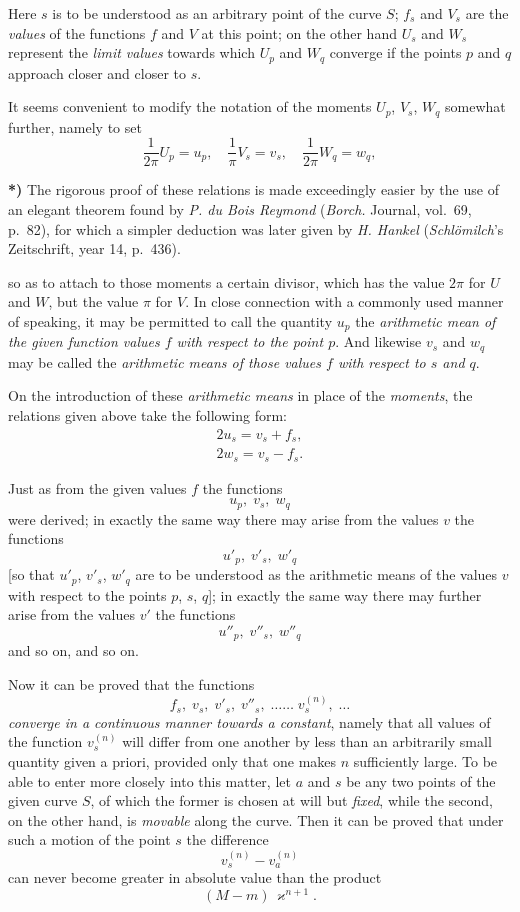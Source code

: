 \documentclass{article}
\begin{document}
Here $s$ is to be understood as an arbitrary point of the curve $S$; $f_{s}$ and $V_{s}$ are the \emph{values} of the functions $f$ and $V$ at this point; on the other hand $U_{s}$ and $W_{s}$ represent the \emph{limit values} towards which $U_{p}$ and $W_{q}$ converge if the points $p$ and $q$ approach closer and closer to $s$.

It seems convenient to modify the notation of the moments $U_{p}$, $V_{s}$, $W_{q}$ somewhat further, namely to set
\[
\frac{1}{2\pi}U_{p}=u_{p}, \quad \frac{1}{\pi}V_{s}=v_{s}, \quad \frac{1}{2\pi}W_{q}=w_{q},
\]

\textbf{*)} The rigorous proof of these relations is made exceedingly easier by the use of an elegant theorem found by \emph{P. du Bois Reymond} (\emph{Borch.} Journal, vol.\ 69, p.\ 82), for which a simpler deduction was later given by \emph{H. Hankel} (\emph{Schlömilch}'s Zeitschrift, year 14, p.\ 436).

so as to attach to those moments a certain divisor, which has the value $2\pi$ for $U$ and $W$, but the value $\pi$ for $V$. In close connection with a commonly used manner of speaking, it may be permitted to call the quantity $u_{p}$ the \emph{arithmetic mean of the given function values $f$ with respect to the point $p$}. And likewise $v_{s}$ and $w_{q}$ may be called the \emph{arithmetic means of those values $f$ with respect to $s$ and $q$}.

On the introduction of these \emph{arithmetic means} in place of the \emph{moments}, the relations given above take the following form:
\[
\begin{gathered}
2u_{s}=v_{s}+f_{s},\\
2w_{s}=v_{s}-f_{s}.
\end{gathered}
\]

Just as from the given values $f$ the functions
\[
u_{p},\; v_{s},\; w_{q}
\]
were derived; in exactly the same way there may arise from the values $v$ the functions
\[
u'_{p},\; v'_{s},\; w'_{q}
\]
[so that $u'_{p}$, $v'_{s}$, $w'_{q}$ are to be understood as the arithmetic means of the values $v$ with respect to the points $p$, $s$, $q$]; in exactly the same way there may further arise from the values $v'$ the functions
\[
u''_{p},\; v''_{s},\; w''_{q}
\]
and so on, and so on.

Now it can be proved that the functions
\[
f_{s},\; v_{s},\; v'_{s},\; v''_{s},\; \ldots\ldots\; v_{s}^{(n)},\; \ldots
\]
\emph{converge in a continuous manner towards a constant}, namely that all values of the function $v_{s}^{(n)}$ will differ from one another by less than an arbitrarily small quantity given a priori, provided only that one makes $n$ sufficiently large. To be able to enter more closely into this matter, let $a$ and $s$ be any two points of the given curve $S$, of which the former is chosen at will but \emph{fixed}, while the second, on the other hand, is \emph{movable} along the curve. Then it can be proved that under such a motion of the point $s$ the difference
\[
v_{s}^{(n)}-v_{a}^{(n)}
\]
can never become greater in absolute value than the product
\[
(M-m)\,\varkappa^{n+1}.
\]
\end{document}
